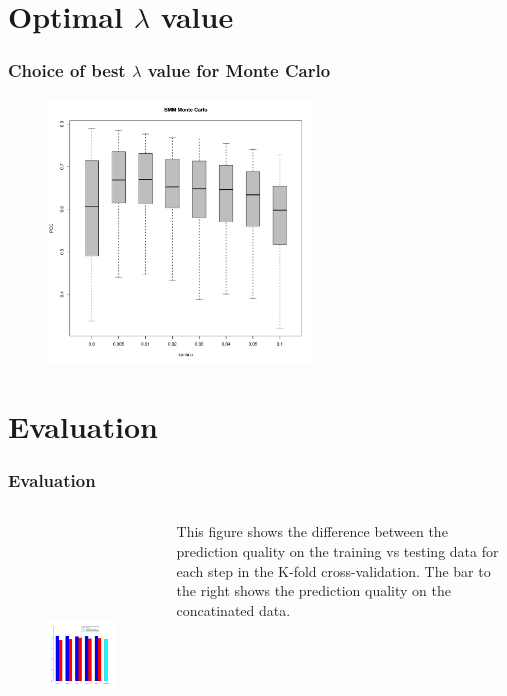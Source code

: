 \documentclass[presentation]{beamer}   %
\begin{document}
\begin{frame}
\section{Optimal $\lambda$ value}
\begin{frame}
  \frametitle{Choice of best $\lambda$ value for Monte Carlo}
	\begin{figure}
		\centering
		\includegraphics[width=70mm,height=70mm]{fig/choice_lambda_mc.pdf}
	\end{figure}
\end{frame}

\section{Evaluation}
\begin{frame}
  \frametitle{Evaluation}
  \begin{columns}[t] %
		\begin{figure}
		\centering
			\includegraphics[width=70mm,height=70mm]{fig/barplot.pdf}
		\end{figure}
		\centering
		\begin{block}\centering
		This figure shows the difference between the prediction quality on the training vs testing data for each step in the K-fold cross-validation. The bar to the right shows the prediction quality on the concatinated data.
		\end{block}
  \end{columns}
\end{frame}


\end{frame}
\end{document}
